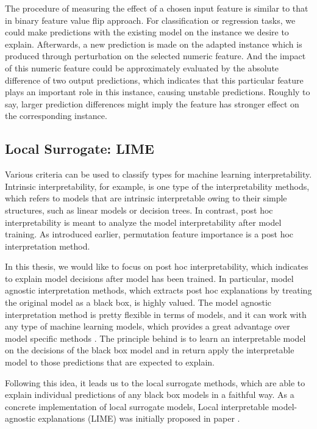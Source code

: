 The procedure of measuring the effect of a chosen input feature is similar to that in binary feature value flip approach. For classification or regression tasks, we could make predictions with the existing model on the instance we desire to explain. Afterwards, a new prediction is made on the adapted instance which is produced through perturbation on the selected numeric feature. And the impact of this numeric feature could be approximately evaluated by the absolute difference of two output predictions, which indicates that this particular feature plays an important role in this instance, causing unstable predictions. Roughly to say, larger prediction differences might imply the feature has stronger effect on the corresponding instance. 


\subsection{Local Surrogate: LIME}

Various criteria can be used to classify types for machine learning interpretability. Intrinsic interpretability, for example, is one type of the interpretability methods, which refers to models that are intrinsic interpretable owing to their simple structures, such as linear models or decision trees. In contrast, post hoc interpretability is meant to analyze the model interpretability after model training. As introduced earlier, permutation feature importance is a post hoc interpretation method. 
 
In this thesis, we would like to focus on post hoc interpretability, which indicates to explain model decisions after model has been trained. In particular, model agnostic interpretation methods, which extracts post hoc explanations by treating the original model as a black box, is highly valued. The model agnostic interpretation method is pretty flexible in terms of models, and it can work with any type of machine learning models, which provides a great advantage over model specific methods \cite{ribeiro2016model}. The principle behind is to learn an interpretable model on the decisions of the black box model and in return apply the interpretable model to those predictions that are expected to explain.  

Following this idea, it leads us to the local surrogate methods, which are able to explain individual predictions of any black box models in a faithful way. As a concrete implementation of local surrogate models, Local interpretable model-agnostic explanations (LIME) was initially proposed in paper \cite{ribeiro2016should}. 

